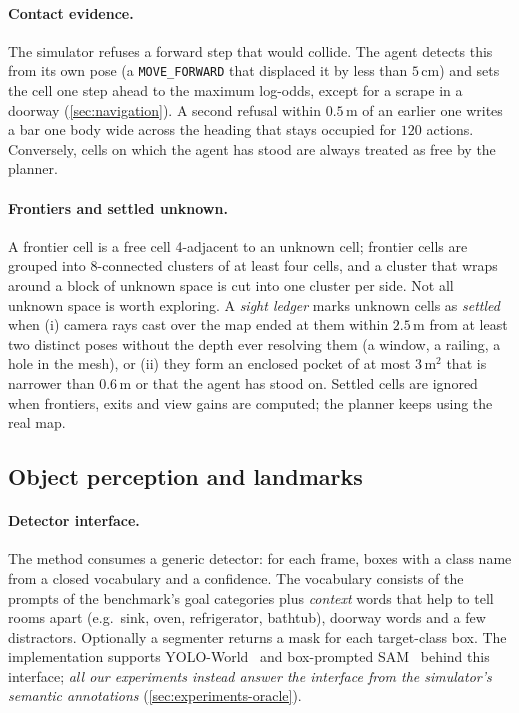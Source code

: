 \documentclass[10pt]{article}
\newcommand{\code}[1]{\texttt{#1}}
\newcommand{\m}{\,\mathrm{m}}
\newcommand{\sqm}{\,\mathrm{m}^2}
\newcommand{\cm}{\,\mathrm{cm}}
\begin{document}
\paragraph{Contact evidence.} The simulator refuses a forward step that would
collide. The agent detects this from its own pose (a \code{MOVE\_FORWARD} that
displaced it by less than $5\cm$) and sets the cell one step ahead to the
maximum log-odds, except for a scrape in a doorway (\cref{sec:navigation}). A
second refusal within $0.5\m$ of an earlier one writes a
bar one body wide across the heading that stays occupied for $120$ actions.
Conversely, cells on which the agent has stood are always treated as free by
the planner.

\paragraph{Frontiers and settled unknown.} A frontier cell is a free cell
4-adjacent to an unknown cell; frontier cells are grouped into 8-connected
clusters of at least four cells, and a cluster that wraps around a block of
unknown space is cut into one cluster per side. Not all unknown space is worth
exploring. A \emph{sight ledger} marks unknown cells as \emph{settled} when
(i) camera rays cast over the map ended at them within $2.5\m$ from at least
two distinct poses without the depth ever resolving them (a window, a railing,
a hole in the mesh), or (ii) they form an enclosed pocket of at most $3\sqm$
that is narrower than $0.6\m$ or that the agent has stood on. Settled cells
are ignored when frontiers, exits and view gains are computed; the planner
keeps using the real map.

\subsection{Object perception and landmarks}\label{sec:perception}
\paragraph{Detector interface.} The method consumes a generic detector: for
each frame, boxes with a class name from a closed vocabulary and a confidence.
The vocabulary consists of the prompts of the benchmark's goal categories plus
\emph{context} words that help to tell rooms apart (e.g.\ sink, oven,
refrigerator, bathtub), doorway words and a few distractors. Optionally a
segmenter returns a mask for each target-class box. The implementation
supports YOLO-World~\citep{cheng2024yolo} and box-prompted
SAM~\citep{kirillov2023segment} behind this interface; \emph{all our
experiments instead answer the interface from the simulator's semantic
annotations} (\cref{sec:experiments-oracle}).
\end{document}
